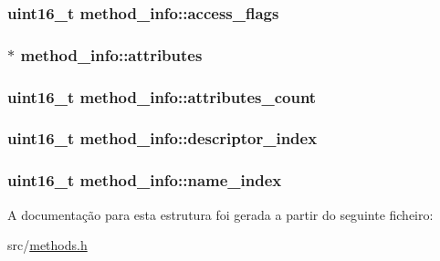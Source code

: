 \subsubsection[{\texorpdfstring{access\+\_\+flags}{access_flags}}]{\setlength{\rightskip}{0pt plus 5cm}uint16\+\_\+t method\+\_\+info\+::access\+\_\+flags}\hypertarget{structmethod__info_a8fc68aba419f2617deda879c467f5410}{}\label{structmethod__info_a8fc68aba419f2617deda879c467f5410}
\subsubsection[{\texorpdfstring{attributes}{attributes}}]{$\ast$ method\+\_\+info\+::attributes}\hypertarget{structmethod__info_a8ce4caaa03680c91f548558a38647ad8}{}\label{structmethod__info_a8ce4caaa03680c91f548558a38647ad8}
\subsubsection[{\texorpdfstring{attributes\+\_\+count}{attributes_count}}]{\setlength{\rightskip}{0pt plus 5cm}uint16\+\_\+t method\+\_\+info\+::attributes\+\_\+count}\hypertarget{structmethod__info_a9e711e4dfb8181f7dce16c6f640ba734}{}\label{structmethod__info_a9e711e4dfb8181f7dce16c6f640ba734}
\subsubsection[{\texorpdfstring{descriptor\+\_\+index}{descriptor_index}}]{\setlength{\rightskip}{0pt plus 5cm}uint16\+\_\+t method\+\_\+info\+::descriptor\+\_\+index}\hypertarget{structmethod__info_abccd6a5202d4c0ee1be6b89692d0352a}{}\label{structmethod__info_abccd6a5202d4c0ee1be6b89692d0352a}
\subsubsection[{\texorpdfstring{name\+\_\+index}{name_index}}]{\setlength{\rightskip}{0pt plus 5cm}uint16\+\_\+t method\+\_\+info\+::name\+\_\+index}\hypertarget{structmethod__info_af0ba3d6d566432e74eed5c37cd998c14}{}\label{structmethod__info_af0ba3d6d566432e74eed5c37cd998c14}


A documentação para esta estrutura foi gerada a partir do seguinte ficheiro\+:\begin{DoxyCompactItemize}
\item 
src/\hyperlink{methods_8h}{methods.\+h}\end{DoxyCompactItemize}
